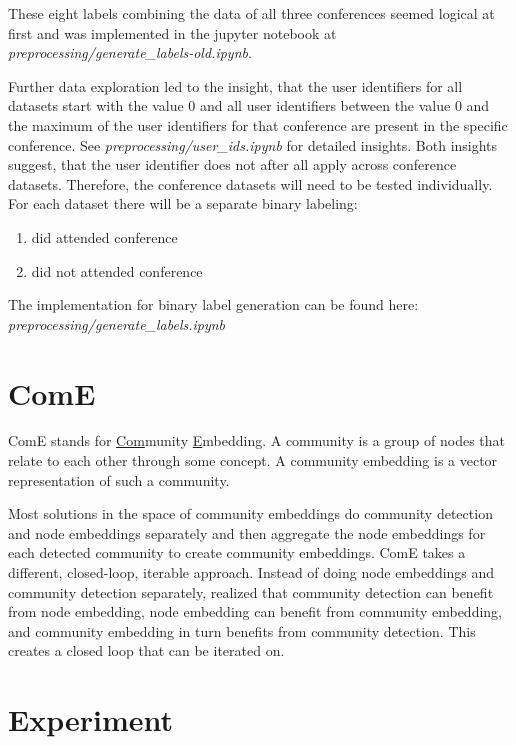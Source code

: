 \documentclass[sigconf]{acmart}
\begin{document}
These eight labels combining the data of all three conferences seemed logical at first and was implemented in the jupyter notebook at \textit{preprocessing/generate\_labels-old.ipynb}.

Further data exploration led to the insight, that the user identifiers for all datasets start with the value $0$ and all user identifiers between the value $0$ and the maximum of the user identifiers for that conference are present in the specific conference. See \textit{preprocessing/user\_ids.ipynb} for detailed insights. Both insights suggest, that the user identifier does not after all apply across conference datasets. Therefore, the conference datasets will need to be tested individually. For each dataset there will be a separate binary labeling:

\begin{enumerate}
	\item did attended conference
	\item did not attended conference
\end{enumerate}

The implementation for binary label generation can be found here: \textit{preprocessing/generate\_labels.ipynb}

\section{ComE}

ComE stands for \underline{Com}munity \underline{E}mbedding. A community is a group of nodes that relate to each other through some concept. A community embedding is a vector representation of such a community.

Most solutions in the space of community embeddings do community detection and node embeddings separately and then aggregate the node embeddings for each detected community to create community embeddings. ComE takes a different, closed-loop, iterable approach. Instead of doing node embeddings and community detection separately, \citeauthor{Cav17} realized that community detection can benefit from node embedding, node embedding can benefit from community embedding, and community embedding in turn benefits from community detection.\cite{Cav17} This creates a closed loop that can be iterated on.



\section{Experiment}
\end{document}
